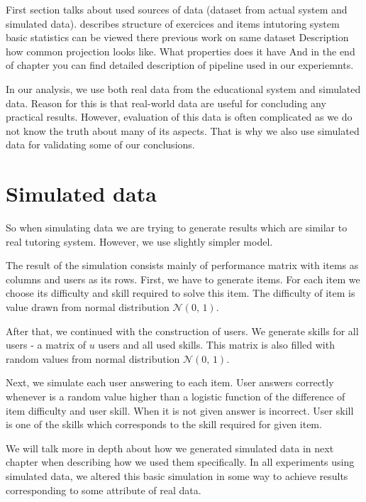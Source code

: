 \documentclass[
  digital, %
  table,   %
  nolof,     %
  nolot,     %
  nocover
]{fithesis3}
\begin{document}
First section talks about used sources of data (dataset from actual system and simulated data).
describes structure of exercices and items intutoring system \umimeCesky{}
basic statistics can be viewed there
previous work on same dataset
Description how common projection looks like. What properties does it have
And in the end of chapter you can find detailed description of pipeline used in our experiemnts.


In our analysis, we use both real data from the educational system and simulated data. Reason for this is that real-world data are useful for concluding any practical results. However, evaluation of this data is often complicated as we do not know the truth about many of its aspects. That is why we also use simulated data for validating some of our conclusions.


\section{Simulated data}\label{simulated-data}

So when simulating data we are trying to generate results which are similar to real tutoring system. However, we use slightly simpler model.

The result of the simulation consists mainly of performance matrix with items as columns and users as its rows. First, we have to generate items. For each item we choose its difficulty and skill required to solve this item. The difficulty of item is value drawn from normal distribution $\mathcal{N}(0,\,1)$.

After that, we continued with the construction of users. We generate skills for all users - a matrix of $u$ users and all used skills. This matrix is also filled with random values from normal distribution $\mathcal{N}(0,\,1)$.

Next, we simulate each user answering to each item. User answers correctly whenever is a random value higher than a logistic function of the difference of item difficulty and user skill. When it is not given answer is incorrect. User skill is one of the skills which corresponds to the skill required for given item.

We will talk more in depth about how we generated simulated data in next chapter when describing how we used them specifically. In all experiments using simulated data, we altered this basic simulation in some way to achieve results corresponding to some attribute of real data.
\end{document}
